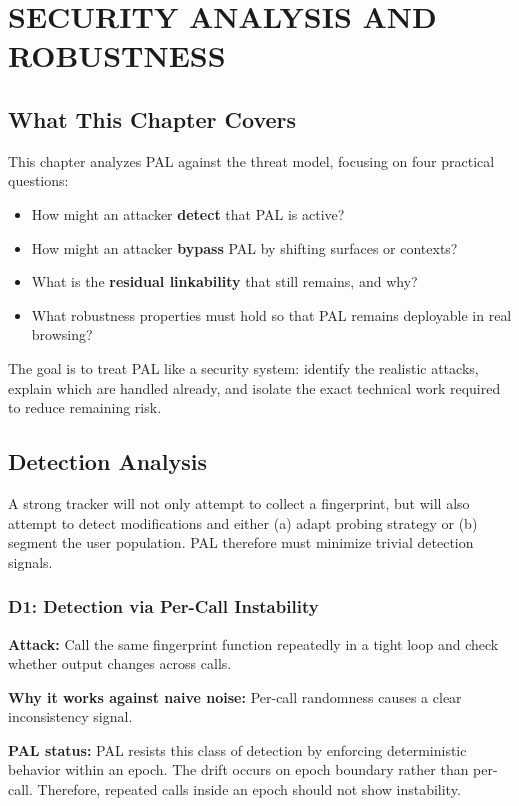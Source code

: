 \documentclass[11pt]{report}
\begin{document}
\chapter{SECURITY ANALYSIS AND ROBUSTNESS}

\section{What This Chapter Covers}

This chapter analyzes PAL against the threat model, focusing on four practical questions:

\begin{itemize}
    \item How might an attacker \textbf{detect} that PAL is active?
    \item How might an attacker \textbf{bypass} PAL by shifting surfaces or contexts?
    \item What is the \textbf{residual linkability} that still remains, and why?
    \item What robustness properties must hold so that PAL remains deployable in real browsing?
\end{itemize}

The goal is to treat PAL like a security system: identify the realistic attacks, explain which are handled already, and isolate the exact technical work required to reduce remaining risk.

\section{Detection Analysis}

A strong tracker will not only attempt to collect a fingerprint, but will also attempt to detect modifications and either (a) adapt probing strategy or (b) segment the user population. PAL therefore must minimize trivial detection signals.

\subsection{D1: Detection via Per-Call Instability}

\textbf{Attack:} Call the same fingerprint function repeatedly in a tight loop and check whether output changes across calls.

\textbf{Why it works against naive noise:} Per-call randomness causes a clear inconsistency signal.

\textbf{PAL status:} PAL resists this class of detection by enforcing deterministic behavior within an epoch. The drift occurs on epoch boundary rather than per-call. Therefore, repeated calls inside an epoch should not show instability.
\end{document}
